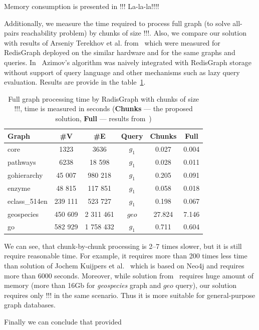 Memory consumption is presented in !!!
La-la-la!!!!

Additionally, we measure the time required to process full graph (to solve all-pairs reachability problem) by chunks of size  !!!.
Also, we compare our solution with results of Arseniy Terekhov et al. from~\cite{10.1145/3398682.3399163} which were measured for RedisGraph deployed on the similar hardware and for the same graphs and queries. In~\cite{10.1145/3398682.3399163} Azimov's algorithm was naively integrated with RedisGraph storage without support of query language and other mechanisms such as lazy query evaluation.
Results are provide in the table~\ref{tbl:redis_full_graph_processing}.

\begin{table}
{
\caption{Full graph processing time by RadisGraph with chunks of size !!!, time is measured in seconds (\textbf{Chunks} --- the proposed solution, \textbf{Full} --- results from~\cite{10.1145/3398682.3399163})}
\label{tbl:redis_full_graph_processing}
\small
{}
\begin{tabular}{|l|c|c|c|c|c|}
\hline
Graph                       & \#V       & \#E      & Query  & Chunks  &  Full  \\
\hline
\hline
core                        & 1323     & 3636       & $g_1$  & 0.027  &  0.004 \\ 
pathways                    & 6238     & 18 598     & $g_1$  & 0.028  &  0.011 \\ 
gohierarchy                 & 45 007   & 980 218    & $g_1$  & 0.205  &  0.091 \\ 
enzyme                      & 48 815   & 117 851    & $g_1$  & 0.058  &  0.018 \\ 
eclass\_514en               & 239 111  & 523 727    & $g_1$  & 0.198  &  0.067 \\ 
geospecies                  & 450 609  & 2 311 461  & $geo$  & 27.824 &  7.146 \\
go                          & 582 929  & 1 758 432  & $g_1$  & 0.711  &  0.604 \\ 
\hline
\end{tabular}
}
\end{table}

We can see, that chunk-by-chunk processing is 2--7 times slower, but it is still require reasonable time.
For example, it requires more than 200 times less time than solution of Jochem Kuijpers et al.~\cite{Kuijpers:2019:ESC:3335783.3335791} which is based on Neo4j and requires more than 6000 seconds.
Moreover, while solution from~\cite{10.1145/3398682.3399163} requires huge amount of memory (more than 16Gb for \textit{geospecies} graph and $geo$ query), our solution requires only !!! in the same scenario.
Thus it is more suitable for general-purpose graph databases.

Finally we can conclude that provided 